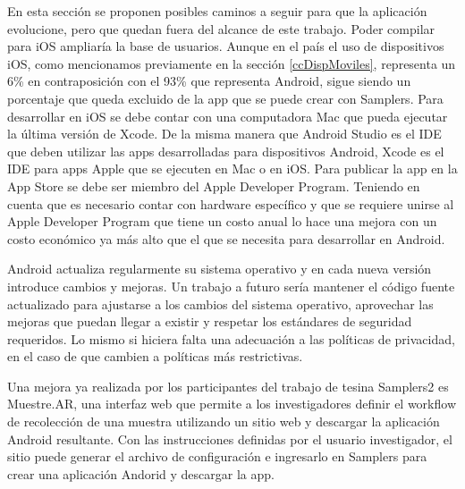En esta sección se proponen posibles caminos a seguir para que la aplicación evolucione, pero que quedan fuera del alcance de este trabajo. Poder compilar para iOS ampliaría la base de usuarios. Aunque en el país el uso de dispositivos iOS, como mencionamos previamente en la sección \ref{ccDispMoviles}, representa un 6\% en contraposición con el 93\% que representa Android, sigue siendo un porcentaje que queda excluido de la app que se puede crear con Samplers. Para desarrollar en iOS se debe contar con una computadora Mac que pueda ejecutar la última versión de Xcode. De la misma manera que Android Studio es el IDE que deben utilizar las apps desarrolladas para dispositivos Android, Xcode es el IDE para apps Apple que se ejecuten en Mac o en iOS. Para publicar la app en la App Store se debe ser miembro del Apple Developer Program. Teniendo en cuenta que es necesario contar con hardware específico \cite{appleDeveloper} y que se requiere unirse al Apple Developer Program que tiene un costo anual \cite{appleEnrollment} lo hace una mejora con un costo económico ya más alto que el que se necesita para desarrollar en Android. 

Android actualiza regularmente su sistema operativo y en cada nueva versión introduce cambios y mejoras. Un trabajo a futuro sería mantener el código fuente actualizado para ajustarse a los cambios del sistema operativo, aprovechar las mejoras que puedan llegar a existir y respetar los estándares de seguridad requeridos. Lo mismo si hiciera falta una adecuación a las políticas de privacidad, en el caso de que cambien a políticas más restrictivas. 

Una mejora ya realizada por los participantes del trabajo de tesina Samplers2 es Muestre.AR, una interfaz web que permite a los investigadores definir el workflow de recolección de una muestra utilizando un sitio web y descargar la aplicación Android resultante. Con las instrucciones definidas por el usuario investigador, el sitio puede generar el archivo de configuración e ingresarlo en Samplers para crear una aplicación Andorid y descargar la app. \cite{samplers2}



